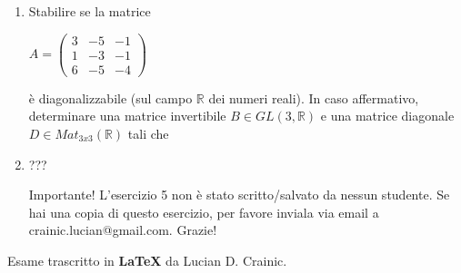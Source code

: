\documentclass[fleqn]{article}
\begin{document}
\begin{enumerate}
   \item Stabilire se la matrice 
   \begin{center}
    $
    A = \begin{pmatrix}
       3 & -5 & -1 \\
       1 & -3 & -1 \\
       6 & -5 & -4
    \end{pmatrix}
    $
    \end{center}
   è diagonalizzabile (sul campo $\mathbb{R}$ dei numeri reali). In caso affermativo, determinare una matrice invertibile
   $B \in GL(3,\mathbb{R})$ e una matrice diagonale $D \in Mat_{3x3}(\mathbb{R})$ tali che  

   \item ??? 
   \begin{bclogo}[logo=\bcattention, couleurBarre=red, noborder=true, 
               couleur=LightSalmon]{Importante!}
    L'esercizio 5 non è stato scritto/salvato da nessun studente. 
    Se hai una copia di questo esercizio, per favore inviala via email a crainic.lucian@gmail.com. Grazie!
\end{bclogo}
\end{enumerate}
Esame trascritto in \textbf{\LaTeX} da Lucian D. Crainic.
\end{document}
